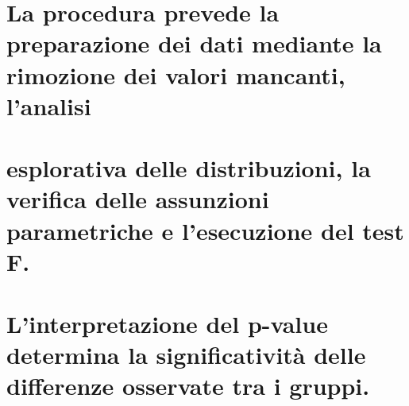 \documentclass[
]{article}
\begin{document}
\section{La procedura prevede la preparazione dei dati mediante la
rimozione dei valori mancanti,
l'analisi}\label{la-procedura-prevede-la-preparazione-dei-dati-mediante-la-rimozione-dei-valori-mancanti-lanalisi}

\section{esplorativa delle distribuzioni, la verifica delle assunzioni
parametriche e l'esecuzione del test
F.}\label{esplorativa-delle-distribuzioni-la-verifica-delle-assunzioni-parametriche-e-lesecuzione-del-test-f.}

\section{L'interpretazione del p-value determina la significatività
delle differenze osservate tra i
gruppi.}\label{linterpretazione-del-p-value-determina-la-significativituxe0-delle-differenze-osservate-tra-i-gruppi.}
\end{document}
